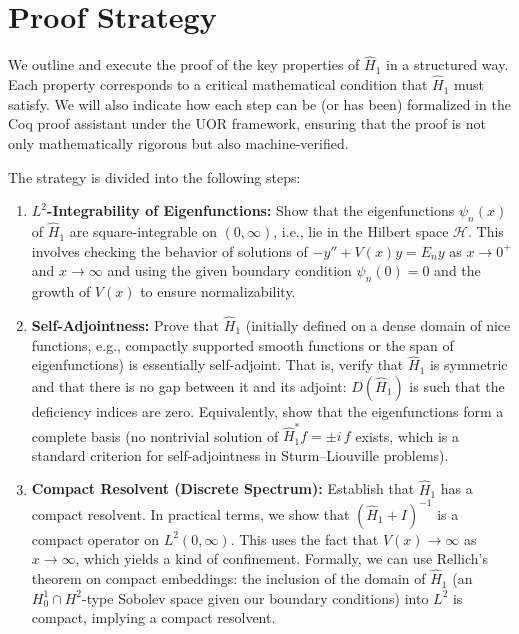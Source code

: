 \documentclass[12pt]{article}
\theoremstyle{plain}
\theoremstyle{definition}
\begin{document}
\section{Proof Strategy}

We outline and execute the proof of the key properties of \(\hat{H}_1\) in a structured way. Each property corresponds to a critical mathematical condition that \(\hat{H}_1\) must satisfy. We will also indicate how each step can be (or has been) formalized in the Coq proof assistant under the UOR framework, ensuring that the proof is not only mathematically rigorous but also machine-verified.

The strategy is divided into the following steps:
\begin{enumerate}[label=(\roman*)]
    \item \textbf{\(L^2\)-Integrability of Eigenfunctions:} Show that the eigenfunctions \(\psi_n(x)\) of \(\hat{H}_1\) are square-integrable on \((0,\infty)\), i.e., lie in the Hilbert space \(\mathcal{H}\). This involves checking the behavior of solutions of \(-y'' + V(x)y = E_n y\) as \(x\to0^+\) and \(x\to\infty\) and using the given boundary condition \(\psi_n(0)=0\) and the growth of \(V(x)\) to ensure normalizability.
    
    \item \textbf{Self-Adjointness:} Prove that \(\hat{H}_1\) (initially defined on a dense domain of nice functions, e.g., compactly supported smooth functions or the span of eigenfunctions) is essentially self-adjoint. That is, verify that \(\hat{H}_1\) is symmetric and that there is no gap between it and its adjoint: \(D(\hat{H}_1)\) is such that the deficiency indices are zero. Equivalently, show that the eigenfunctions form a complete basis (no nontrivial solution of \(\hat{H}_1^* f = \pm i \,f\) exists, which is a standard criterion for self-adjointness in Sturm--Liouville problems).
    
    \item \textbf{Compact Resolvent (Discrete Spectrum):} Establish that \(\hat{H}_1\) has a compact resolvent. In practical terms, we show that \((\hat{H}_1 + I)^{-1}\) is a compact operator on \(L^2(0,\infty)\). This uses the fact that \(V(x)\to\infty\) as \(x\to\infty\), which yields a kind of confinement. Formally, we can use Rellich's theorem on compact embeddings: the inclusion of the domain of \(\hat{H}_1\) (an \(H^1_0\cap H^2\)-type Sobolev space given our boundary conditions) into \(L^2\) is compact, implying a compact resolvent.
    

\end{enumerate}
\end{document}
